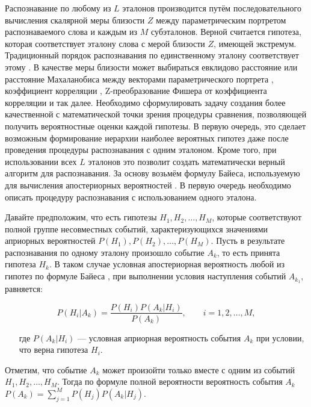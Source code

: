 Распознавание по любому из $L$ эталонов производится путём последовательного вычисления скалярной меры близости $Z$ между параметрическим портретом распознаваемого слова и каждым из $M$ субэталонов.
Верной считается гипотеза, которая соответствует эталону слова с мерой близости $Z$, имеющей экстремум.
Традиционный порядок распознавания по единственному эталону соответствует этому \cite{rabiner1993fundamentals}.
В качестве меры близости может выбираться евклидово расстояние или расстояние Махаланобиса между векторами параметрического портрета \cite{rabiner1993fundamentals}, коэффициент корреляции \cite{korsun2016automatic}, Z-преобразование Фишера от коэффициента корреляции \cite{korsun2017recognition} и так далее.
Необходимо сформулировать задачу создания более качественной с математической точки зрения процедуры сравнения, позволяющей получить вероятностные оценки каждой гипотезы.
В первую очередь, это сделает возможным формирование иерархии наиболее вероятных гипотез даже после проведения процедуры распознавания с одним эталоном.
Кроме того, при использовании всех $L$ эталонов это позволит создать математически верный алгоритм для распознавания.
За основу возьмём формулу Байеса, используемую для вычисления апостериорных вероятностей \cite{ventcel1999theory}.
В первую очередь необходимо описать процедуру распознавания с использованием одного эталона.

Давайте предположим, что есть гипотезы $H_1, H_2, \dots, H_M$, которые соответствуют полной группе несовместных событий, характеризующихся значениями априорных вероятностей $P(H_1), P(H_2), \dots, P(H_M)$.
Пусть в результате распознавания по одному эталону произошло событие $A_k$, то есть принята гипотеза $H_k$.
В таком случае условная апостериорная вероятность любой из гипотез по формуле Байеса \cite{ventcel1999theory}, при выполнении условия наступления событий $A_{k_1}$, равняется:

\begin{equation}\label{eq:2_5_1_1}
P(H_i|A_k) = \frac{P(H_i) P(A_k|H_i)}{P(A_k)},
\qquad
i = 1, 2, \dots, M,
\end{equation}
\begin{itemize}[align=left,leftmargin=1.8em,itemindent=0pt,labelsep=0pt,labelwidth=1.8em]
	\item[где] $P(A_k|H_i)$ --- условная априорная вероятность события $A_k$ при условии, что верна гипотеза $H_i$.
\end{itemize}

Отметим, что событие $A_k$ может произойти только вместе с одним из событий $H_1, H_2, \dots, H_M$.
Тогда по формуле полной вероятности \cite{ventcel1999theory} вероятность события $A_k$ $P(A_k) = \sum_{j=1}^M P(H_j) P(A_k|H_j)$.

